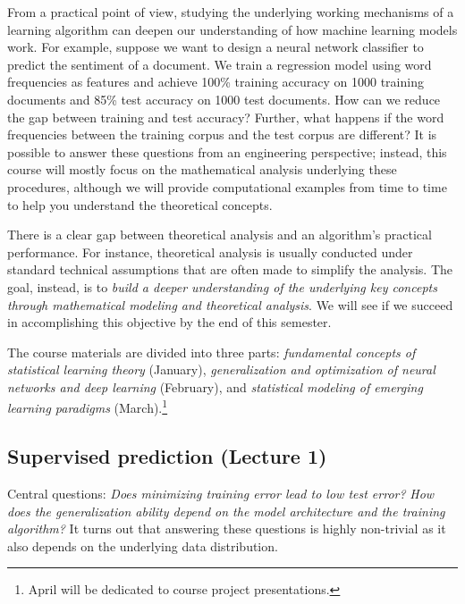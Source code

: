 From a practical point of view, studying the underlying working mechanisms of a learning algorithm can deepen our understanding of how machine learning models work.
For example, suppose we want to design a neural network classifier to predict the sentiment of a document.
We train a regression model using word frequencies as features and achieve 100\% training accuracy on 1000 training documents and 85\% test accuracy on 1000 test documents.
How can we reduce the gap between training and test accuracy?
Further, what happens if the word frequencies between the training corpus and the test corpus are different?
It is possible to answer these questions from an engineering perspective; instead, this course will mostly focus on the mathematical analysis underlying these procedures, although we will provide computational examples from time to time to help you understand the theoretical concepts.

There is a clear gap between theoretical analysis and an algorithm's practical performance.
For instance, theoretical analysis is usually conducted under standard technical assumptions that are often made to simplify the analysis.
The goal, instead, is to \emph{build a deeper understanding of the underlying key concepts through mathematical modeling and theoretical analysis}.
We will see if we succeed in accomplishing this objective by the end of this semester.

The course materials are divided into three parts: \emph{fundamental concepts of statistical learning theory} (January), \emph{generalization and optimization of neural networks and deep learning} (February), and \emph{statistical modeling of emerging learning paradigms} (March).\footnote{April will be dedicated to course project presentations.}

\subsection{Supervised prediction (Lecture 1)}

Central questions: \emph{Does minimizing training error lead to low test error?}
\emph{How does the generalization ability depend on the model architecture and the training algorithm?}
It turns out that answering these questions is highly non-trivial as it also depends on the underlying data distribution.%

